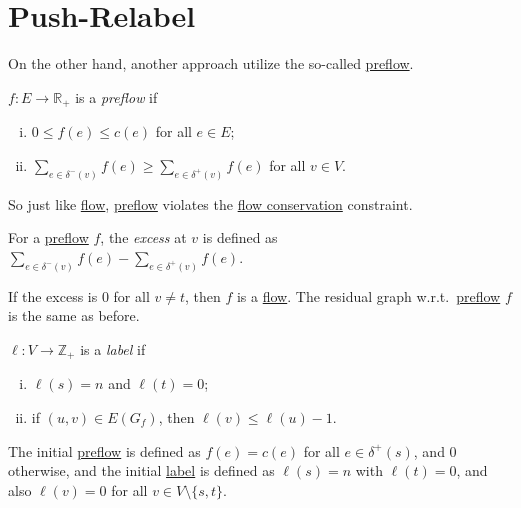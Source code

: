 \section{Push-Relabel}
On the other hand, another approach utilize the so-called \hyperref[def:preflow]{preflow}.\cite{goldberg1988new}

\begin{definition}[Preflow]\label{def:preflow}
	\(f \colon E \to \mathbb{R} _{+}\) is a \emph{preflow} if
	\begin{enumerate}[(i)]
		\item \(0 \leq f(e) \leq c(e)\) for all \(e \in E\);
		\item \(\sum_{e \in \delta ^-(v)} f(e) \geq \sum_{e \in \delta ^+(v)}f(e) \) for all \(v \in V\).
	\end{enumerate}
\end{definition}

So just like \hyperref[def:flow]{flow}, \hyperref[def:preflow]{preflow} violates the \hyperref[def:flow-conservation]{flow conservation} constraint.

\begin{notation}
	For a \hyperref[def:preflow]{preflow} \(f\), the \emph{excess} at \(v\) is defined as \(\sum_{e \in \delta ^-(v)} f(e) - \sum_{e \in \delta ^+(v)} f(e)\).
\end{notation}

If the excess is \(0\) for all \(v \neq t\), then \(f\) is a \hyperref[def:flow]{flow}. The residual graph w.r.t.\ \hyperref[def:preflow]{preflow} \(f\) is the same as before.

\begin{definition}[Label]\label{def:label}
	\(\ell \colon V \to \mathbb{Z} _{+}\) is a \emph{label} if
	\begin{enumerate}[(i)]
		\item \(\ell (s) = n\) and \(\ell (t) = 0\);
		\item if \((u, v) \in E(G_f)\), then \(\ell (v) \leq \ell (u) - 1\).
	\end{enumerate}
\end{definition}

The initial \hyperref[def:preflow]{preflow} is defined as \(f(e) = c(e)\) for all \(e \in \delta ^+(s)\), and \(0\) otherwise, and the initial \hyperref[def:label]{label} is defined as \(\ell (s) = n\) with \(\ell (t) = 0\), and also \(\ell (v) = 0\) for all \(v \in V \setminus \{ s, t \} \).

